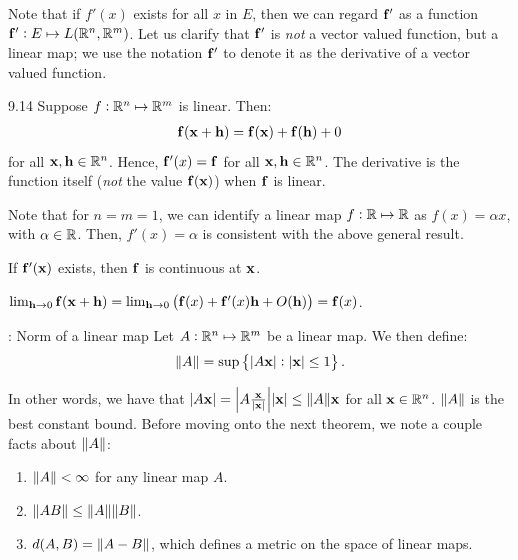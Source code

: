 \noindent Note that if $f'(x)$ exists for all $x$ in $E$, then we can regard $\mathbf{f}'$ as a function $\mathbf{f}': E \mapsto L(\mathbb{R}^n, \mathbb{R}^m)$. Let us clarify that $\mathbf{f}'$ is \emph{not} a vector valued function, but a linear map; we use the notation $\mathbf{f}'$ to denote it as the derivative of a vector valued function.

\setcounter{rudin}{13}
\begin{example}{}{9.14}
    Suppose $f: \mathbb{R}^n \mapsto \mathbb{R}^m$ is linear. Then:
    \begin{align*}
        \mathbf{f}(\mathbf{x} + \mathbf{h}) = \mathbf{f}(\mathbf{x}) + \mathbf{f}(\mathbf{h}) + 0
    \end{align*}
    for all $\mathbf{x}, \mathbf{h} \in \mathbb{R}^n$. Hence, $\mathbf{f}'(x) = \mathbf{f}$ for all $\mathbf{x}, \mathbf{h} \in \mathbb{R}^n$. The derivative is the function itself (\emph{not} the value $\mathbf{f}(\mathbf{x})$) when $\mathbf{f}$ is linear.

    Note that for $n = m = 1$, we can identify a linear map $f: \mathbb{R} \mapsto \mathbb{R}$ as $f(x) = \alpha x$, with $\alpha \in \mathbb{R}$. Then, $f'(x) = \alpha$ is consistent with the above general result.
\end{example}
\begin{ntheorem}{}{}
    If $\mathbf{f}'(\mathbf{x})$ exists, then $\mathbf{f}$ is continuous at $\mathbf{x}$.
\end{ntheorem}
\begin{nproof}
    $\lim_{\mathbf{h} \rightarrow 0}\mathbf{f}(\mathbf{x} + \mathbf{h}) = \lim_{\mathbf{h} \rightarrow 0}\left(\mathbf{f}(x) + \mathbf{f}'(x)\mathbf{h} + O(\mathbf{h})\right) = \mathbf{f}(x)$.
\end{nproof}

\begin{ndef}{: Norm of a linear map}{}
    Let $A: \mathbb{R}^n \mapsto \mathbb{R}^m$ be a linear map. We then define:
    \begin{align*}
        \norm{A} = \sup\set{\abs{A\ensuremath{\mathbf{x}}}: \abs{\ensuremath{\mathbf{x}}} \leq 1}.
    \end{align*}
\end{ndef}
\noindent In other words, we have that $\abs{A\mathbf{x}} = \abs{A\frac{\mathbf{x}}{\abs{\mathbf{x}}}}\abs{\mathbf{x}} \leq \norm{A}\mathbf{x}$ for all $\mathbf{x} \in \mathbb{R}^n$. $\norm{A}$ is the best constant bound. Before moving onto the next theorem, we note a couple facts about $\norm{A}$:
\begin{enumerate}
    \item $\norm{A} < \infty$ for any linear map $A$.
    \item $\norm{AB} \leq \norm{A}\norm{B}$.
    \item $d(A, B) = \norm{A - B}$, which defines a metric on the space of linear maps.
\end{enumerate}

